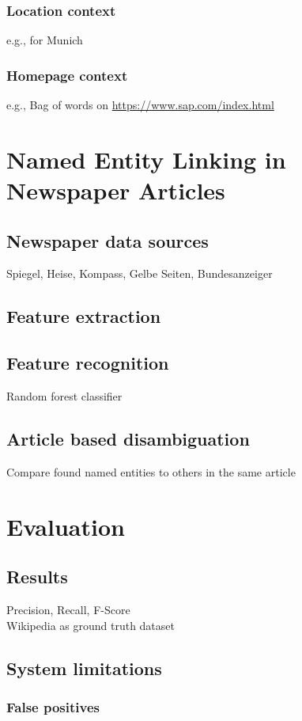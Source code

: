 \documentclass[
        a4paper,     %
        titlepage,   %
        twoside,     %
        parskip      %
        ]{scrartcl} %
\begin{document}
\subsubsection{Location context}
e.g., for Munich
\subsubsection{Homepage context}
e.g., Bag of words on \url{https://www.sap.com/index.html}

\section{Named Entity Linking in Newspaper Articles}
\subsection{Newspaper data sources}
Spiegel, Heise, Kompass, Gelbe Seiten, Bundesanzeiger
\subsection{Feature extraction}
\subsection{Feature recognition}
Random forest classifier

\subsection{Article based disambiguation}
Compare found named entities to others in the same article

\section{Evaluation}
\subsection{Results}
Precision, Recall, F-Score\\
Wikipedia as ground truth dataset

\subsection{System limitations}
\subsubsection{False positives}
\end{document}
